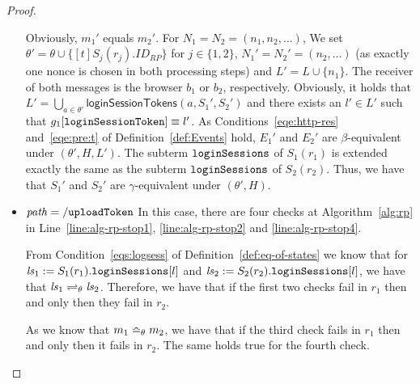 \begin{proof}
\begin{itemize}
        Obviously, $m_1'$ equals $m_2'$. For $N_1 = N_2 = 
        (n_1, n_2, \dots)$, We set $\theta' = \theta \cup 
        \{ [t]S_j(r_j).ID_{RP} \}$ for $j\in \{1, 2\}$, 
        $N_1' = N_2' = (n_2, \dots)$ (as exactly one nonce is 
        chosen in both processing steps) and 
        $L' = L \cup \{n_1\}$. 
        The receiver of both messages is the browser $b_1$ or 
        $b_2$, respectively. Obviously, it holds that
        $L' = \bigcup_{a\in\theta'} 
        \mathsf{loginSessionTokens}(a,S_1',S_2')$
        and there exists an $l' \in L'$ such that
        $g_1[\mathtt{loginSessionToken}] \equiv l'$. As
        Conditions~\ref{eqe:http-res} and~\ref{eqe:pre:t} of
        Definition~\ref{def:Events} hold, $E_1'$ and $E_2'$ are
        $\beta$-equivalent under $(\theta',H,L')$. The subterm
        $\mathtt{loginSessions}$ of $S_1(r_1)$ is extended exactly 
        the same as the subterm $\mathtt{loginSessions}$ of 
        $S_2(r_2)$. Thus, we have that $S_1'$ and $S_2'$ are
        $\gamma$-equivalent under $(\theta',H)$.
      \item $\mathit{path} = \mathtt{/uploadToken}$ In this case, 
        there are four checks at Algorithm~\ref{alg:rp} in
        Line~\ref{line:alg-rp-stop1}, %
        \ref{line:alg-rp-stop2} and \ref{line:alg-rp-stop4}.
        
        From Condition~\ref{eqs:logsess} of 
        Definition~\ref{def:eq-of-states} we know that for 
        $\mathit{ls}_1 := S_1(r_1).\mathtt{loginSessions}[l]$ and 
        $\mathit{ls}_2 := S_2(r_2).\mathtt{loginSessions}[l]$, 
        we have that $\mathit{ls}_1 \rightleftharpoons_{\theta} \mathit{ls}_2$.
        Therefore, we have that if the first two checks fail in
        $r_1$ then and only then they fail in $r_2$.
  
        As we know that $m_1 \bumpeq_{\theta} m_2$, we have 
        that if the third check fails in $r_1$ then and only 
        then it fails in $r_2$. The same holds true for the 
        fourth check.
  

\end{itemize}
\end{proof}

